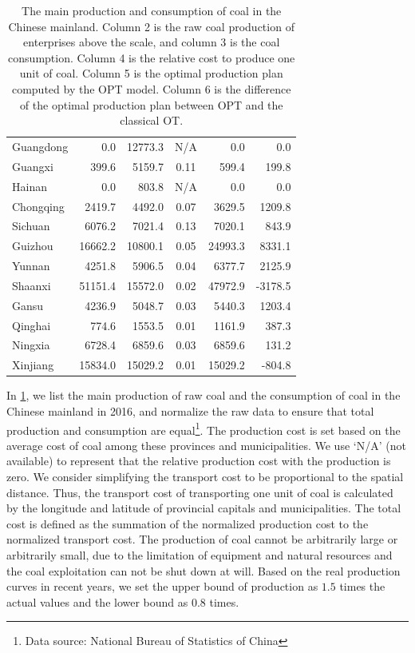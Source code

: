 \documentclass[review,hidelinks,onefignum,onetabnum]{siamart220329}
\begin{document}
\begin{table}[t]
\begin{scriptsize}
\begin{tabular}{l|rrcrr}
    Guangdong  & 0.0   & 12773.3  & N/A   & 0.0   & 0.0  \\
    Guangxi  & 399.6  & 5159.7  & 0.11  &  599.4 &  199.8 \\
    Hainan & 0.0   & 803.8  & N/A   & 0.0   & 0.0  \\
    Chongqing  & 2419.7  & 4492.0  & 0.07  & 3629.5  &  1209.8 \\
    Sichuan  & 6076.2  & 7021.4  & 0.13  & 7020.1  & 843.9 \\
    Guizhou  & 16662.2  & 10800.1  & 0.05  & 24993.3  & 8331.1  \\
    Yunnan  & 4251.8  & 5906.5  & 0.04  & 6377.7  & 2125.9  \\
    Shaanxi  & 51151.4  & 15572.0  & 0.02  & 47972.9 &  -3178.5 \\
    Gansu  & 4236.9  & 5048.7  & 0.03  & 5440.3  & 1203.4 \\
    Qinghai  & 774.6  & 1553.5 & 0.01  &   1161.9  &  387.3\\
    Ningxia  & 6728.4  & 6859.6  & 0.03  & 6859.6  &  131.2 \\
    Xinjiang  & 15834.0  & 15029.2 & 0.01  & 15029.2  & -804.8\\
    \hline
    \end{tabular}%
    \caption{The main production and consumption of coal in the Chinese mainland. Column 2 is the raw coal production of enterprises above the scale, and column 3 is the coal consumption. Column 4 is the relative cost to produce one unit of coal. 
    Column 5 is the optimal production plan computed by the OPT model. 
    Column 6 is the difference of the optimal production plan between OPT and the classical OT. }
  \label{tab:coal_basic}%
  \end{scriptsize}
\end{table}%

In \cref{tab:coal_basic}, we list the main production of raw coal and the consumption of coal in the Chinese mainland in 2016, and normalize the raw data to ensure that total production and consumption are equal\footnote{Data source: National Bureau of Statistics of China}. 
The production cost is set based on the average cost of coal among these provinces and municipalities. 
We use `N/A' (not available) to represent that the relative production cost with the production is zero. 
We consider simplifying the transport cost to be proportional to the spatial distance.
Thus, the transport cost of transporting one unit of coal is calculated by the longitude and latitude of provincial capitals and municipalities. The total cost is defined as the summation of the normalized production cost to the normalized transport cost. 
The production of coal cannot be arbitrarily large or arbitrarily small, due to the limitation of equipment and natural resources and the coal exploitation can not be shut down at will. Based on the real production curves in recent years, we set the upper bound of production as $1.5$ times the actual values  and the lower bound as $0.8$ times.
\end{document}
